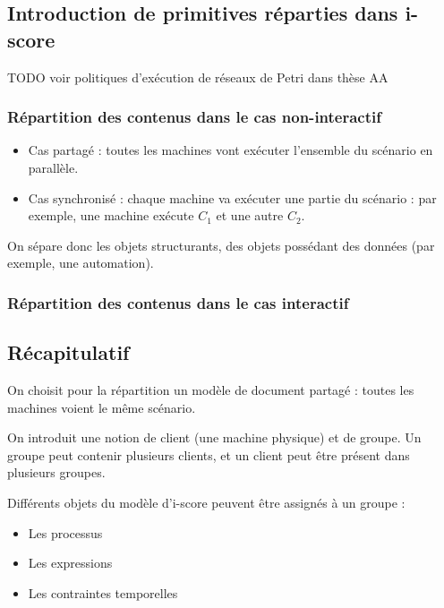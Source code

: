 \documentclass{article}
\begin{document}
\subsection{Introduction de primitives réparties dans i-score}
TODO voir politiques d'exécution de réseaux de Petri dans thèse AA

\subsubsection{Répartition des contenus dans le cas non-interactif}
\begin{figure}[h]
    \centering
    \begin{tikzpicture}
    
    \end{tikzpicture}
    \label{scenar.simple}
\end{figure}

\begin{itemize}
    \item Cas partagé : toutes les machines vont exécuter l'ensemble du scénario en parallèle.
    \item Cas synchronisé : chaque machine va exécuter une partie du scénario : par exemple, une machine exécute $C_1$ et une autre $C_2$.
\end{itemize}

On sépare donc les objets structurants, des objets possédant des données (par exemple, une automation).


\subsubsection{Répartition des contenus dans le cas interactif}
\subsection{Récapitulatif}
On choisit pour la répartition un modèle de document partagé : toutes les machines voient le même scénario.

On introduit une notion de client (une machine physique) et de groupe.
Un groupe peut contenir plusieurs clients, et un client peut être présent dans plusieurs groupes.

Différents objets du modèle d'i-score peuvent être assignés à un groupe : 

\begin{itemize}
	\item Les processus
	\item Les expressions
	\item Les contraintes temporelles
\end{itemize}
\end{document}
